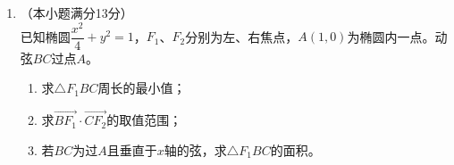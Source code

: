 \documentclass[12pt, a4paper]{ctexart}
\begin{document}
\begin{enumerate}[resume]
\item （本小题满分13分）\\
已知椭圆$\dfrac{x^2}{4}+y^2=1$，$F_1$、$F_2$分别为左、右焦点，$A(1,0)$为椭圆内一点。动弦$BC$过点$A$。
\begin{enumerate}[(1)]
\item 求$\triangle F_1BC$周长的最小值；
\item 求$\overrightarrow{BF_1}\cdot\overrightarrow{CF_2}$的取值范围；
\item 若$BC$为过$A$且垂直于$x$轴的弦，求$\triangle F_1BC$的面积。
\end{enumerate}

\end{enumerate}
\end{document}
